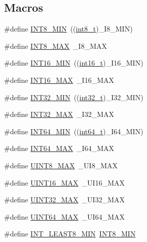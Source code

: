 \subsection*{Macros}
\begin{DoxyCompactItemize}
\item 
\#define \hyperlink{a00119_aadcf2a81af243df333b31efa6461ab8e}{I\+N\+T8\+\_\+\+M\+IN}~((\hyperlink{a00119_a27eddd12ef1271a2ea8629e1148e7e63}{int8\+\_\+t})\+\_\+\+I8\+\_\+\+M\+IN)
\item 
\#define \hyperlink{a00119_aaf7f29f45f1a513b4748a4e5014ddf6a}{I\+N\+T8\+\_\+\+M\+AX}~\+\_\+\+I8\+\_\+\+M\+AX
\item 
\#define \hyperlink{a00119_ad4e9955955b27624963643eac448118a}{I\+N\+T16\+\_\+\+M\+IN}~((\hyperlink{a00119_a044293bfeff56852a28ed6c2cfbb2649}{int16\+\_\+t})\+\_\+\+I16\+\_\+\+M\+IN)
\item 
\#define \hyperlink{a00119_ac58f2c111cc9989c86db2a7dc4fd84ca}{I\+N\+T16\+\_\+\+M\+AX}~\+\_\+\+I16\+\_\+\+M\+AX
\item 
\#define \hyperlink{a00119_a688eb21a22db27c2b2bd5836943cdcbe}{I\+N\+T32\+\_\+\+M\+IN}~((\hyperlink{a00119_a37994e3b11c72957c6f454c6ec96d43d}{int32\+\_\+t})\+\_\+\+I32\+\_\+\+M\+IN)
\item 
\#define \hyperlink{a00119_a181807730d4a375f848ba139813ce04f}{I\+N\+T32\+\_\+\+M\+AX}~\+\_\+\+I32\+\_\+\+M\+AX
\item 
\#define \hyperlink{a00119_ab21f12f372f67b8ff0aa3432336ede67}{I\+N\+T64\+\_\+\+M\+IN}~((\hyperlink{a00119_a67a9885ef4908cb72ce26d75b694386c}{int64\+\_\+t})\+\_\+\+I64\+\_\+\+M\+IN)
\item 
\#define \hyperlink{a00119_ad0d744f05898e32d01f73f8af3cd2071}{I\+N\+T64\+\_\+\+M\+AX}~\+\_\+\+I64\+\_\+\+M\+AX
\item 
\#define \hyperlink{a00119_aeb4e270a084ee26fe73e799861bd0252}{U\+I\+N\+T8\+\_\+\+M\+AX}~\+\_\+\+U\+I8\+\_\+\+M\+AX
\item 
\#define \hyperlink{a00119_a3ea490c9b3617d4479bd80ef93cd5602}{U\+I\+N\+T16\+\_\+\+M\+AX}~\+\_\+\+U\+I16\+\_\+\+M\+AX
\item 
\#define \hyperlink{a00119_ab5eb23180f7cc12b7d6c04a8ec067fdd}{U\+I\+N\+T32\+\_\+\+M\+AX}~\+\_\+\+U\+I32\+\_\+\+M\+AX
\item 
\#define \hyperlink{a00119_a30654b4b67d97c42ca3f9b6052dda916}{U\+I\+N\+T64\+\_\+\+M\+AX}~\+\_\+\+U\+I64\+\_\+\+M\+AX
\item 
\#define \hyperlink{a00119_a3e986cad833f63f420962ff60eda87e5}{I\+N\+T\+\_\+\+L\+E\+A\+S\+T8\+\_\+\+M\+IN}~\hyperlink{a00119_aadcf2a81af243df333b31efa6461ab8e}{I\+N\+T8\+\_\+\+M\+IN}

\end{DoxyCompactItemize}
